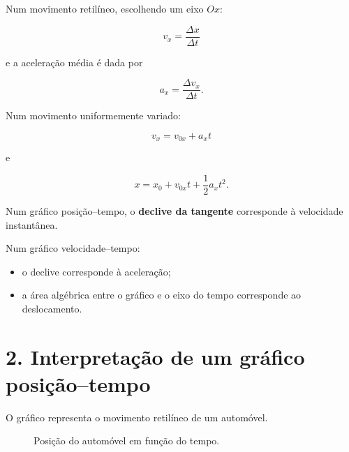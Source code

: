 \documentclass[11pt,a4paper]{article}
\begin{document}
	\begin{recorda}
		
		Num movimento retilíneo, escolhendo um eixo $Ox$:
		
		\[
		v_x=\frac{\Delta x}{\Delta t}
		\]
		
		e a aceleração média é dada por
		
		\[
		a_x=\frac{\Delta v_x}{\Delta t}.
		\]
		
		Num movimento uniformemente variado:
		
		\[
		v_x=v_{0x}+a_x t
		\]
		
		e
		
		\[
		x=x_0+v_{0x}t+\frac{1}{2}a_xt^2.
		\]
		
		Num gráfico posição--tempo, o \textbf{declive da tangente} corresponde à
		velocidade instantânea.
		
		Num gráfico velocidade--tempo:
		
		\begin{itemize}
			\item o declive corresponde à aceleração;
			\item a área algébrica entre o gráfico e o eixo do tempo corresponde
			ao deslocamento.
		\end{itemize}
		
	\end{recorda}
	
	\section{2. Interpretação de um gráfico posição--tempo}
	
	O gráfico representa o movimento retilíneo de um automóvel.
	
	\begin{figure}[H]
		\centering
		
		
		\caption{Posição do automóvel em função do tempo.}
		
	\end{figure}
	
\end{document}
